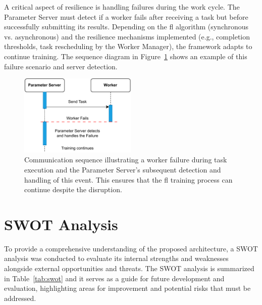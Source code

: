 A critical aspect of resilience is handling failures during the work cycle. The Parameter Server must detect if a worker fails after receiving a task but before successfully submitting its results. Depending on the \ac{fl} algorithm (synchronous vs. asynchronous) and the resilience mechanisms implemented (e.g., completion thresholds, task rescheduling by the Worker Manager), the framework adapts to continue training. The sequence diagram in Figure~\ref{fig:seq:worker_fails_work} shows an example of this failure scenario and server detection.

\begin{figure}[!htb]
    \centering
    \includegraphics[width=0.5\textwidth]{figs/worker_fails_work.pdf}
    \caption[Worker Failure and Server Detection]{Communication sequence illustrating a worker failure during task execution and the Parameter Server's subsequent detection and handling of this event. This ensures that the \ac{fl} training process can continue despite the disruption.}
    \label{fig:seq:worker_fails_work}
\end{figure}



\section{SWOT Analysis}
\label{sec:swot_analysis}

To provide a comprehensive understanding of the proposed architecture, a SWOT analysis was conducted to evaluate its internal strengths and weaknesses alongside external opportunities and threats. The SWOT analysis is summarized in Table~\ref{tab:swot} and it serves as a guide for future development and evaluation, highlighting areas for improvement and potential risks that must be addressed.

